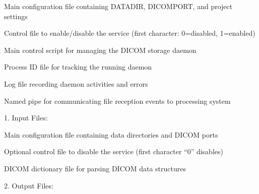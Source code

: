 \documentclass[letterpaper,10pt,english]{sphinxmanual}
\begin{document}
\begin{DUlineblock}{0em}
\item[] \sphinxhyphen{}  \sphinxhyphen{} Main configuration file containing DATADIR, DICOMPORT, and project settings
\item[] \sphinxhyphen{}  \sphinxhyphen{} Control file to enable/disable the service (first character: 0=disabled, 1=enabled)
\item[] \sphinxhyphen{}  \sphinxhyphen{} Main control script for managing the DICOM storage daemon
\item[] \sphinxhyphen{}  \sphinxhyphen{} Process ID file for tracking the running daemon
\item[] \sphinxhyphen{}  \sphinxhyphen{} Log file recording daemon activities and errors
\item[] \sphinxhyphen{}  \sphinxhyphen{} Named pipe for communicating file reception events to processing system
\end{DUlineblock}

\sphinxAtStartPar
{}


\sphinxAtStartPar
{}

\begin{DUlineblock}{0em}
\item[] 1. Input Files:
\end{DUlineblock}

\begin{DUlineblock}{0em}
\item[] \sphinxhyphen{}  \sphinxhyphen{} Main configuration file containing data directories and DICOM ports
\item[] \sphinxhyphen{}  \sphinxhyphen{} Optional control file to disable the service (first character “0” disables)
\item[] \sphinxhyphen{}  \sphinxhyphen{} DICOM dictionary file for parsing DICOM data structures
\end{DUlineblock}

\begin{DUlineblock}{0em}
\item[] 2. Output Files:
\end{DUlineblock}
\end{document}
